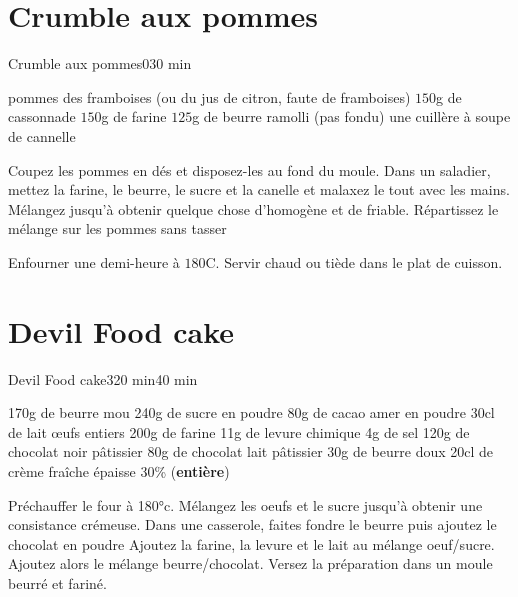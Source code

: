 {\section{Crumble aux pommes}
\begin{recette}{Crumble aux pommes}{0}{}{30 min}
\begin{ingredients}
 pommes
\ingredient des framboises (ou du jus de citron, faute de framboises)
\ingredient $150$g de cassonnade
\ingredient $150$g de farine
\ingredient $125$g de beurre ramolli (pas fondu)
\ingredient une cuillère à soupe de cannelle
\end{ingredients}

\begin{preparation}
\etape Coupez les pommes en dés et disposez-les au fond du moule.
\etape Dans un saladier, mettez la farine, le beurre, le sucre et la canelle et malaxez le tout avec les mains. Mélangez jusqu'à 
obtenir quelque chose d'homogène et de friable.
\etape Répartissez le mélange sur les pommes sans tasser
\end{preparation}

\begin{cuisson}
Enfourner une demi-heure à $180$\degres C. Servir chaud ou tiède dans le plat de cuisson.
\end{cuisson}
\end{recette}

\section{Devil Food cake}
\begin{recette}{Devil Food cake}{3}{20 min}{40 min}
\begin{ingredients}
\ingredient[Gâteau]
\ingredient 170g de beurre mou
\ingredient 240g de sucre en poudre
\ingredient 80g de cacao amer en poudre
\ingredient 30cl de lait
 œufs entiers
\ingredient 200g de farine 
\ingredient 11g de levure chimique
\ingredient 4g de sel
\ingredient[Glaçage]
\ingredient 120g de chocolat noir pâtissier
\ingredient 80g de chocolat lait pâtissier
\ingredient 30g de beurre doux
\ingredient 20cl de crème fraîche épaisse 30\% (\textbf{entière})
\end{ingredients}

\begin{preparation}
\etape Préchauffer le four à 180°c. 
\etape Mélangez les oeufs et le sucre jusqu'à obtenir une consistance crémeuse. 
\etape Dans une casserole, faites fondre le beurre puis ajoutez le chocolat en poudre
\etape Ajoutez la farine, la levure et le lait au mélange oeuf/sucre. 
\etape Ajoutez alors le mélange beurre/chocolat. 
\etape Versez la préparation dans un moule beurré et fariné. 
\end{preparation}


\end{recette}}
